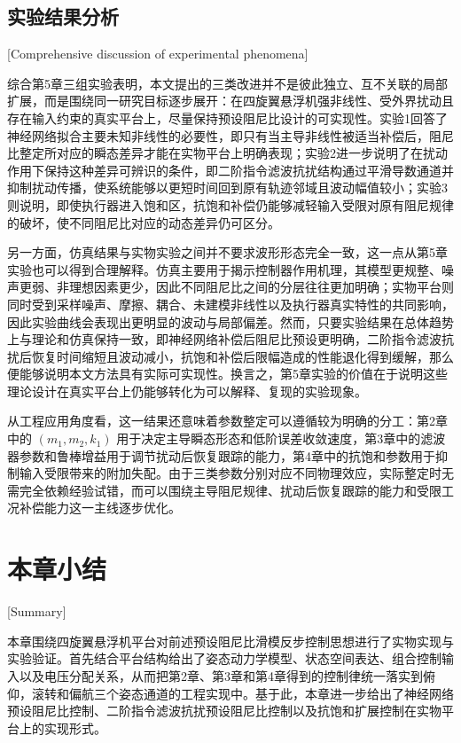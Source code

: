 \subsection{实验结果分析}[Comprehensive discussion of experimental phenomena]

综合第5章三组实验表明，本文提出的三类改进并不是彼此独立、互不关联的局部扩展，而是围绕同一研究目标逐步展开：在四旋翼悬浮机强非线性、受外界扰动且存在输入约束的真实平台上，尽量保持预设阻尼比设计的可实现性。实验1回答了神经网络拟合主要未知非线性的必要性，即只有当主导非线性被适当补偿后，阻尼比整定所对应的瞬态差异才能在实物平台上明确表现；实验2进一步说明了在扰动作用下保持这种差异可辨识的条件，即二阶指令滤波抗扰结构通过平滑导数通道并抑制扰动传播，使系统能够以更短时间回到原有轨迹邻域且波动幅值较小；实验3则说明，即使执行器进入饱和区，抗饱和补偿仍能够减轻输入受限对原有阻尼规律的破坏，使不同阻尼比对应的动态差异仍可区分。

另一方面，仿真结果与实物实验之间并不要求波形形态完全一致，这一点从第5章实验也可以得到合理解释。仿真主要用于揭示控制器作用机理，其模型更规整、噪声更弱、非理想因素更少，因此不同阻尼比之间的分层往往更加明确；实物平台则同时受到采样噪声、摩擦、耦合、未建模非线性以及执行器真实特性的共同影响，因此实验曲线会表现出更明显的波动与局部偏差。然而，只要实验结果在总体趋势上与理论和仿真保持一致，即神经网络补偿后阻尼比预设更明确，二阶指令滤波抗扰后恢复时间缩短且波动减小，抗饱和补偿后限幅造成的性能退化得到缓解，那么便能够说明本文方法具有实际可实现性。换言之，第5章实验的价值在于说明这些理论设计在真实平台上仍能够转化为可以解释、复现的实验现象。

从工程应用角度看，这一结果还意味着参数整定可以遵循较为明确的分工：第2章中的 $(m_1,m_2,k_1)$ 用于决定主导瞬态形态和低阶误差收敛速度，第3章中的滤波器参数和鲁棒增益用于调节扰动后恢复跟踪的能力，第4章中的抗饱和参数用于抑制输入受限带来的附加失配。由于三类参数分别对应不同物理效应，实际整定时无需完全依赖经验试错，而可以围绕主导阻尼规律、扰动后恢复跟踪的能力和受限工况补偿能力这一主线逐步优化。

\section{本章小结}[Summary]

本章围绕四旋翼悬浮机平台对前述预设阻尼比滑模反步控制思想进行了实物实现与实验验证。首先结合平台结构给出了姿态动力学模型、状态空间表达、组合控制输入以及电压分配关系，从而把第2章、第3章和第4章得到的控制律统一落实到俯仰，滚转和偏航三个姿态通道的工程实现中。基于此，本章进一步给出了神经网络预设阻尼比控制、二阶指令滤波抗扰预设阻尼比控制以及抗饱和扩展控制在实物平台上的实现形式。

